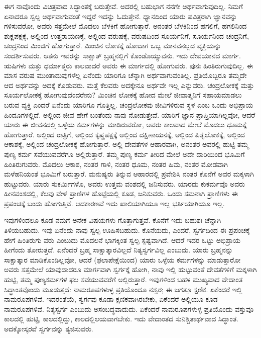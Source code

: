 \vskip 5pt

ಈಗ ನಾವೊಂದು ವಿಚಿತ್ರವಾದ ಸಿದ್ಧಾಂತಕ್ಕೆ ಬರುತ್ತೇವೆ. ಅದರಲ್ಲಿ ಬಹುಭಾಗ ನನಗೇ ಅರ್ಥವಾಗುವುದಿಲ್ಲ. ನಿಮಗೆ ಏನಾದರೂ ಸ್ವಲ್ಪ ಅರ್ಥವಾಗುವಂತೆ ಇದ್ದರೆ ಇದನ್ನು ಓದುತ್ತೇನೆ. ಧ್ಯಾನದಿಂದ ಯಾರು ಪವಿತ್ರರಾಗಿ ಜ್ಞಾನವನ್ನು ಗಳಿಸುವರೋ, ಅವರು ಸತ್ತಮೇಲೆ ಮೊದಲು ಬೆಳಕಿಗೆ ಹೋಗುತ್ತಾರೆ. ಅನಂತರ ಬೆಳಕಿನಿಂದ ಹಗಲಿಗೆ, ಹಗಲಿನಿಂದ ಶುಕ್ಲಪಕ್ಷಕ್ಕೆ, ಅಲ್ಲಿಂದ ಉತ್ತರಾಯಣಕ್ಕೆ, ಅಲ್ಲಿಂದ ವರುಷಕ್ಕೆ, ವರುಷದಿಂದ ಸೂರ್ಯನಿಗೆ, ಸೂರ್ಯನಿಂದ ಚಂದ್ರನಿಗೆ, ಚಂದ್ರನಿಂದ ಮಿಂಚಿಗೆ ಹೋಗುತ್ತಾರೆ. ಮಿಂಚಿನ ಲೋಕಕ್ಕೆ ಹೋದಾಗ ಒಬ್ಬ ಮಾನವನಲ್ಲದ ವ್ಯಕ್ತಿಯನ್ನು ಸಂದರ್ಶಿಸುವರು. ಆತನು ಇವರನ್ನು ಸಾಕ್ಷಾತ್​ ಬ್ರಹ್ಮನಲ್ಲಿಗೆ ಕೊಂಡೊಯ್ಯುವನು. ಇದು ದೇವಯಾನದ ಮಾರ್ಗ. ಋಷಿಗಳು ಮತ್ತು ಧರ್ಮಾತ್ಮರು ಕಾಲವಾದರೆ ಅವರು ಈ ಮಾರ್ಗದಲ್ಲಿ ಹೋಗುವರು. ಪುನಃ ಹಿಂತಿರುಗುವುದಿಲ್ಲ. ಈ ಮಾಸ ವರುಷ ಮುಂತಾದುವುಗಳೆಲ್ಲ ಏನೆಂದು ಯಾರಿಗೂ ಚೆನ್ನಾಗಿ ಅರ್ಥವಾಗುವಂತಿಲ್ಲ. ಪ್ರತಿಯೊಬ್ಬರೂ ತಮ್ಮದೇ ಆದ ಅರ್ಥವನ್ನು ಅದಕ್ಕೆ ಕೊಡುವರು. ಮತ್ತೆ ಕೆಲವರು ಅದಕ್ಕೇನೂ ಅರ್ಥವೇ ಇಲ್ಲ ಎನ್ನುವರು. ಚಂದ್ರಲೋಕಕ್ಕೆ ಮತ್ತು ಸೂರ್ಯಲೋಕಕ್ಕೆ ಹೋಗುವುದೆಂದರೇನು? ಮಿಂಚಿನ ಲೋಕಕ್ಕೆ ಹೋದ ಮೇಲೆ ಜೀವಾತ್ಮನಿಗೆ ಸಹಾಯಮಾಡಲು ಬರುವ ವ್ಯಕ್ತಿ ಎಂದರೆ ಏನೆಂದು ಯಾರಿಗೂ ಗೊತ್ತಿಲ್ಲ. ಚಂದ್ರಲೋಕವು ಜೀವಿಗಳಿರುವ ಸ್ಥಳ ಎಂಬ ಒಂದು ಅಭಿಪ್ರಾಯ ಹಿಂದೂಗಳಲ್ಲಿದೆ. ಅಲ್ಲಿಂದ ಜೀವ ಹೇಗೆ ಬಂತೆಂದು ನಾವು ನೋಡುತ್ತೇವೆ. ಯಾರಿಗೆ ಜ್ಞಾನ ಪ್ರಾಪ್ತಿಯಾಗಿಲ್ಲವೋ, ಆದರೆ ಯಾರು ಈ ಜೀವನದಲ್ಲಿ ಒಳ್ಳೆಯ ಕರ್ಮಗಳನ್ನು ಮಾಡಿರುವರೋ, ಅವರು ಕಾಲವಾದ ಮೇಲೆ ಮೊದಲು ಧೂಮಕ್ಕೆ ಹೋಗುತ್ತಾರೆ. ಅಲ್ಲಿಂದ ರಾತ್ರಿಗೆ, ಅಲ್ಲಿಂದ ಕೃಷ್ಣಪಕ್ಷಕ್ಕೆ ಅಲ್ಲಿಂದ ದಕ್ಷಿಣಾಯನಕ್ಕೆ, ಅಲ್ಲಿಂದ ಪಿತೃಲೋಕಕ್ಕೆ, ಅಲ್ಲಿಂದ ಆಕಾಶಕ್ಕೆ, ಅಲ್ಲಿಂದ ಚಂದ್ರಲೋಕಕ್ಕೆ ಹೋಗುತ್ತಾರೆ. ಅಲ್ಲಿ ದೇವತೆಗಳ ಆಹಾರವಾಗಿ, ಅನಂತರ ಅವರಲ್ಲಿ ಹುಟ್ಟಿ ತಮ್ಮ ಪುಣ್ಯ ಕರ್ಮ ಸವೆಯುವವರೆಗೂ ಅಲ್ಲಿರುತ್ತಾರೆ. ತಮ್ಮ ಪುಣ್ಯ ಕರ್ಮ ತೀರಿದ ಮೇಲೆ ಅದೇ ದಾರಿಯಿಂದ ಭೂಮಿಗೆ ಹಿಂತಿರುಗುವರು. ಮೊದಲು ಆಕಾಶ, ನಂತರ ಗಾಳಿ, ನಂತರ ಧೂಮ, ನಂತರ ಹಿಮ, ನಂತರ ಮೋಡವಾಗಿ ಮಳೆಹನಿಯಂತೆ ಭೂಮಿಗೆ ಬರುತ್ತಾರೆ. ಮನುಷ್ಯರು ತಿನ್ನುವ ಆಹಾರದಲ್ಲಿ ಪ್ರವೇಶಿಸಿ ನಂತರ ಕೊನೆಗೆ ಅವರ ಮಕ್ಕಳಾಗಿ ಹುಟ್ಟುವರು. ಯಾರು ಸುಕರ್ಮಿಗಳೊ, ಅವರು ಉತ್ತಮ ವಂಶದಲ್ಲಿ ಜನಿಸುವರು. ಯಾರದು ಕುಕರ್ಮವೊ ಅವರು ಹೀನವಂಶದಲ್ಲಿ, ಕೆಲವು ವೇಳೆ ಪ್ರಾಣಿಗಳ ಹೊಟ್ಟೆಯಲ್ಲಿ ಕೂಡ, ಜನಿಸುವರು. ಒಂದು ಸಮನಾಗಿ ಪ್ರಾಣಿಗಳು ಈ ಪ್ರಪಂಚಕ್ಕೆ ಬಂದು ಹೋಗುತ್ತಿವೆ. ಆದಕಾರಣವೆ ಇದು ಖಾಲಿಯಾಗಿಯೂ ಇಲ್ಲ ಭರ್ತಿಯಾಗಿಯೂ ಇಲ್ಲ. 

\vskip 6pt

ಇವುಗಳಿಂದಲೂ ಕೂಡ ನಮಗೆ ಅನೇಕ ವಿಷಯಗಳು ಗೊತ್ತಾಗುತ್ತವೆ. ಕೊನೆಗೆ ಇದು ಬಹುಶಃ ಚೆನ್ನಾಗಿ ತಿಳಿಯಬಹುದು. ಇವು ಏನೆಂದು ನಾವು ಸ್ವಲ್ಪ ಊಹಿಸಬಹುದು. ಕೊನೆಯದು, ಎಂದರೆ, ಸ್ವರ್ಗದಿಂದ ಈ ಪ್ರಪಂಚಕ್ಕೆ ಹೇಗೆ ಹಿಂತಿರುಗು ವರು ಎಂಬುದು ಮೊದಲನೆ ಭಾಗಕ್ಕಿಂತ ಸ್ವಲ್ಪ ಸ್ಪಷ್ಟವಾಗಿದೆ. ಆದರೆ ಇದರ ಒಟ್ಟು ಅಭಿಪ್ರಾಯ ಹೀಗೆಂದು ತೋರುತ್ತದೆ. ಏನೆಂದರೆ ಬ್ರಹ್ಮ ಸಾಕ್ಷಾತ್ಕಾರವಿಲ್ಲದೆ ನಿತ್ಯಸ್ವರ್ಗವಿಲ್ಲ ಎಂಬುದು. ಯಾರು ಬ್ರಹ್ಮನನ್ನು ಸಾಕ್ಷಾತ್ಕಾರ ಮಾಡಿಕೊಂಡಿಲ್ಲವೋ, ಆದರೆ (ಫಲಾಪೇಕ್ಷೆಯಿಂದ) ಯಾರು ಒಳ್ಳೆಯ ಕರ್ಮಗಳನ್ನು ಮಾಡುತ್ತಾರೋ ಅವರು ಸತ್ತಮೇಲೆ ಯಾವುದಾದರೂ ಮಾರ್ಗವಾಗಿ ಸ್ವರ್ಗಕ್ಕೆ ಹೋಗಿ, ನಾವು ಇಲ್ಲಿ ಹುಟ್ಟುವಂತೆ ದೇವತೆಗಳಿಗೆ ಮಕ್ಕಳಾಗಿ ಹುಟ್ಟಿ, ತಮ್ಮ ಪುಣ್ಯಕರ್ಮಗಳ ಫಲ ಸವೆಯುವವರೆಗೆ ಅಲ್ಲಿರುತ್ತಾರೆ. ಇವುಗಳಿಂದ ಬಹಳ ಮುಖ್ಯವಾದ ವೇದಾಂತ ಸಿದ್ಧಾಂತವೊಂದು ಮೂಡುತ್ತದೆ: ನಾಮರೂಪಗಳುಳ್ಳ ಪ್ರತಿಯೊಂದೂ ನಶ್ವರ; ಈ ಜಗತ್ತೂ ಕ್ಷಣಿಕ. ಏಕೆಂದರೆ ಇಲ್ಲಿ ನಾಮರೂಪಗಳಿವೆ. ಇದರಂತೆಯೆ, ಸ್ವರ್ಗವು ಕೂಡಾ ಕ್ಷಣಿಕವಾಗಿರಬೇಕು, ಏಕೆಂದರೆ ಅಲ್ಲಿಯೂ ಕೂಡ ನಾಮರೂಪಗಳಿವೆ. ನಿತ್ಯಸ್ವರ್ಗ ಎಂಬುದು ಅಸಂಬದ್ಧವಾದುದು. ಏಕೆಂದರೆ ನಾಮರೂಪಗಳುಳ್ಳ ಪ್ರತಿಯೊಂದು ವಸ್ತುವೂ ಕಾಲದಲ್ಲಿ ಹುಟ್ಟಿ, ಕಾಲದಲ್ಲಿದ್ದು, ಕಾಲದಲ್ಲಿಲಯವಾಗಬೇಕು. ಇದು ವೇದಾಂತದ ಸುನಿಶ್ಚಿತಾರ್ಥವಾದ ಸಿದ್ಧಾಂತ. ಅದಕ್ಕೋಸ್ಕರವೆ ಸ್ವರ್ಗವನ್ನು ತ್ಯಜಿಸುವರು. 

